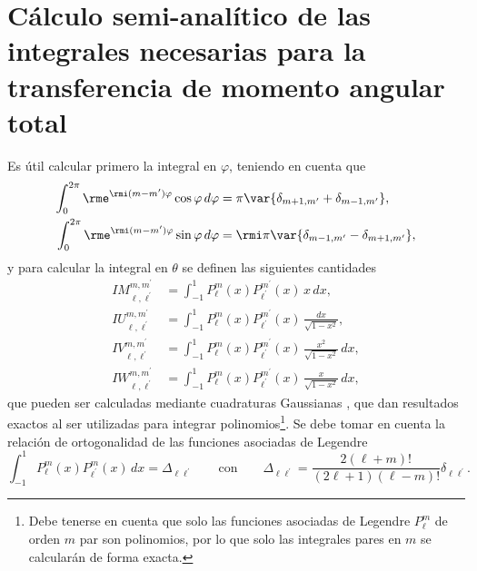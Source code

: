 \section{Cálculo semi-analítico de las integrales necesarias para la transferencia de momento angular total}
Es útil calcular primero la integral en $\varphi$, teniendo en cuenta que 
\begin{align}
\int_0^{2\pi} \rme^{\rmi (m-m^{\prime}) \varphi} \cos\varphi  \, d\varphi &= \pi \var{ \delta_{m+1, m^{\prime}} + \delta_{m-1, m^{\prime}} },\\
\int_0^{2\pi} \rme^{\rmi (m-m^{\prime}) \varphi} \sin\varphi  \, d\varphi &= \rmi \pi \var{ \delta_{m-1, m^{\prime}} - \delta_{m+1, m^{\prime}} },
\end{align}
\vspace{-0.8 cm}
y para calcular la integral en $\theta$ se definen las siguientes cantidades
\begin{align}
IM_{\ell,\ell^{\prime}}^{m,m^{\prime}} &=\int_{-1}^1 P_{\ell}^{m}(x) P_{\ell^{\prime}}^{m^{\prime}}(x) \,x \, dx, \\
IU_{\ell,\ell^{\prime}}^{m,m^{\prime}} &=\int_{-1}^1 P_{\ell}^{m}(x) P_{\ell^{\prime}}^{m^{\prime}}(x) \, \frac{dx}{\sqrt{1-x^2}}, \\
IV_{\ell,\ell^{\prime}}^{m,m^{\prime}} &=\int_{-1}^1 P_{\ell}^{m}(x) P_{\ell^{\prime}}^{m^{\prime}}(x) \, \frac{x^2}{\sqrt{1-x^2}} \, dx, \\
IW_{\ell,\ell^{\prime}}^{m,m^{\prime}} &=\int_{-1}^1 P_{\ell}^{m}(x) P_{\ell^{\prime}}^{m^{\prime}}(x) \, \frac{x}{\sqrt{1-x^2}} \, dx, 
\end{align}
que pueden ser calculadas mediante cuadraturas Gaussianas \cite{kahaner1989numerical}, que dan resultados exactos al ser utilizadas para integrar polinomios\footnote{Debe tenerse en cuenta que solo las funciones asociadas de Legendre $P_{\ell}^m$ de orden $m$ par son polinomios, por lo que solo las integrales pares en $m$ se calcularán de forma exacta.}. Se debe tomar en cuenta la relación de ortogonalidad de las funciones asociadas de Legendre \cite{Abramowitz}
\begin{equation}
\int_{-1}^{1} P_{\ell}^{m}(x) P_{\ell^{\prime}}^{m}(x) \, dx = \Delta_{\ell \ell^{\prime}} \qquad \text{con} \qquad \Delta_{\ell \ell^{\prime}}= \frac{2(\ell+m)!}{(2\ell+1)(\ell-m)!} \delta_{\ell \ell^{\prime}}.
\end{equation}

